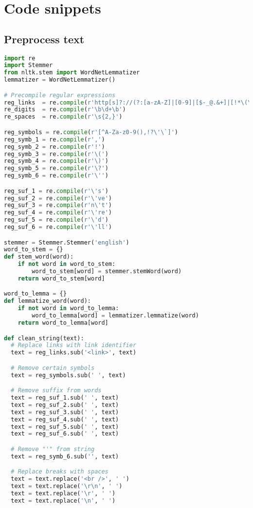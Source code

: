
\section{Code snippets}

\subsection{Preprocess text}
\label{app:preprocess-text}

\begin{lstlisting}[language=python]
import re
import Stemmer
from nltk.stem import WordNetLemmatizer
lemmatizer = WordNetLemmatizer()

# Precompile regular expressions
reg_links  = re.compile(r'http[s]?://(?:[a-zA-Z]|[0-9]|[$-_@.&+]|[!*\(\),]|(?:%[0-9a-fA-F][0-9a-fA-F]))+')
re_digits  = re.compile(r'\b\d+\b')
re_spaces  = re.compile(r'\s{2,}')

reg_symbols = re.compile(r'[^A-Za-z0-9(),!?\'\`]')
reg_symb_1 = re.compile(r',')
reg_symb_2 = re.compile(r'!')
reg_symb_3 = re.compile(r'\(')
reg_symb_4 = re.compile(r'\)')
reg_symb_5 = re.compile(r'\?')
reg_symb_6 = re.compile(r'\'')

reg_suf_1 = re.compile(r'\'s')
reg_suf_2 = re.compile(r'\'ve')
reg_suf_3 = re.compile(r'n\'t')
reg_suf_4 = re.compile(r'\'re')
reg_suf_5 = re.compile(r'\'d')
reg_suf_6 = re.compile(r'\'ll')

stemmer = Stemmer.Stemmer('english')
word_to_stem = {}
def stem_word(word):
    if not word in word_to_stem:
        word_to_stem[word] = stemmer.stemWord(word)
    return word_to_stem[word]

word_to_lemma = {}
def lemmatize_word(word):
    if not word in word_to_lemma:
        word_to_lemma[word] = lemmatizer.lemmatize(word)
    return word_to_lemma[word]

def clean_string(text):
  # Replace links with link identifier
  text = reg_links.sub('<link>', text)

  # Remove certain symbols
  text = reg_symbols.sub(' ', text)

  # Remove suffix from words
  text = reg_suf_1.sub(' ', text)
  text = reg_suf_2.sub(' ', text)
  text = reg_suf_3.sub(' ', text)
  text = reg_suf_4.sub(' ', text)
  text = reg_suf_5.sub(' ', text)
  text = reg_suf_6.sub(' ', text)

  # Remove "'" from string
  text = reg_symb_6.sub('', text)

  # Replace breaks with spaces
  text = text.replace('<br />', ' ')
  text = text.replace('\r\n', ' ')
  text = text.replace('\r', ' ')
  text = text.replace('\n', ' ')


\end{lstlisting}
